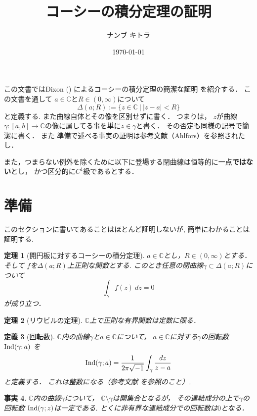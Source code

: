 \documentclass[leqno, 12pt, a4paper]{jsarticle}
\title{コーシーの積分定理の証明}
\author{ナンブ キトラ}
\date{\today}
\newtheorem{thm}{定理}
\newtheorem{df}[thm]{定義}
\newtheorem{fact}[thm]{事実}
\newcommand{\cc}{\mathbb{C}}
\newcommand{\ind}{\text{{\rm Ind}}}
\newcommand{\img}{\sqrt{-1}}
\begin{document}
\maketitle
この文書ではDixon (\cite{3})
によるコーシーの積分定理の簡潔な証明
 を紹介する．
 この文書を通して
 $a\in \cc$と$R\in (0, \infty)$について
\[
\Delta(a;R):=\{z\in \cc\ | \ |z-a|<R\}
\]
と定義する.
また曲線自体とその像を区別せずに書く．
つまりは，
$z$が曲線$\gamma:[a,b]\to \cc$の像に属してる事を単に$z\in \gamma$と書く．
その否定も同様の記号で簡潔に書く．
また
準備で述べる事実の証明は参考文献\cite{1}（Ahlfors）を参照されたし．
\par
また，つまらない例外を除くために以下に登場する閉曲線は恒等的に一点\textbf{ではない}とし，
かつ区分的に$C^1$級であるとする．







\section{準備}
このセクションに書いてあることはほとんど証明しないが,
簡単にわかることは証明する.

\begin{thm}[開円板に対するコーシーの積分定理]\label{thm1}
$a\in \cc$とし，$R\in (0, \infty)$とする．そして
$f$を$\Delta(a;R)$上正則な関数とする.
このとき任意の閉曲線$\gamma\subset \Delta(a;R)$について
\[
\int_{\gamma}f(z)\ dz=0
\]
が成り立つ．
\end{thm}


\begin{thm}[リウビルの定理]
$\cc$上で正則な有界関数は定数に限る．
\end{thm}

\begin{df}[回転数]
$\cc$内の曲線$\gamma$と$a\in \cc$について，
$a\in\cc$に対する$\gamma$の回転数$\ind(\gamma; a)$
を
\[
\ind(\gamma; a)=
\frac{1}{2\pi \img}\int_{\gamma}\frac{dz}{z-a}
\]
と定義する．
これは整数になる（参考文献 \cite{1} を参照のこと）.

\end{df}


\begin{fact}\label{fact1}
$\cc$内の曲線$\gamma$について，
$\cc\setminus \gamma $は開集合となるが，
その連結成分の上で$\gamma$の回転数
$\ind(\gamma; z)$は一定である.
とくに非有界な連結成分での回転数は$0$となる．
\end{fact}
\end{document}
